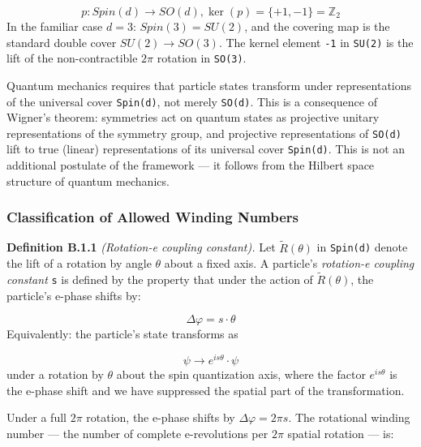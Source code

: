 \documentclass[aps,prd,preprint,superscriptaddress,longbibliography,floatfix]{revtex4-2}
\theoremstyle{remark}
\begin{document}
\begin{equation}
    p : Spin(d) \to SO(d),    \ker(p) = \{+1, -1\} = \mathbb{Z}_{2}
\end{equation}
In the familiar case $d = 3$: $Spin(3) = SU(2)$, and the covering map is the standard double cover $SU(2) \to SO(3)$. The kernel element \texttt{-1} in \texttt{SU(2)} is the lift of the non-contractible $2\pi$ rotation in \texttt{SO(3)}.

Quantum mechanics requires that particle states transform under representations of the universal cover \texttt{Spin(d)}, not merely \texttt{SO(d)}. This is a consequence of Wigner's theorem: symmetries act on quantum states as projective unitary representations of the symmetry group, and projective representations of \texttt{SO(d)} lift to true (linear) representations of its universal cover \texttt{Spin(d)}. This is not an additional postulate of the framework --- it follows from the Hilbert space structure of quantum mechanics.


\subsubsection{Classification of Allowed Winding Numbers}

\textbf{Definition B.1.1} \textit{(Rotation-e coupling constant).} Let $\tilde{R}(\theta)$ in \texttt{Spin(d)} denote the lift of a rotation by angle $\theta$ about a fixed axis. A particle's \textit{rotation-e coupling constant} \texttt{s} is defined by the property that under the action of $\tilde{R}(\theta)$, the particle's e-phase shifts by:


\begin{equation}
    \Delta\varphi = s \cdot \theta
\end{equation}
Equivalently: the particle's state transforms as


\begin{equation}
    \psi \to e^{is\theta} \cdot \psi
\end{equation}
under a rotation by $\theta$ about the spin quantization axis, where the factor $e^{is\theta}$ is the e-phase shift and we have suppressed the spatial part of the transformation.

Under a full $2\pi$ rotation, the e-phase shifts by $\Delta\varphi = 2\pi s$. The rotational winding number --- the number of complete e-revolutions per $2\pi$ spatial rotation --- is:
\end{document}
